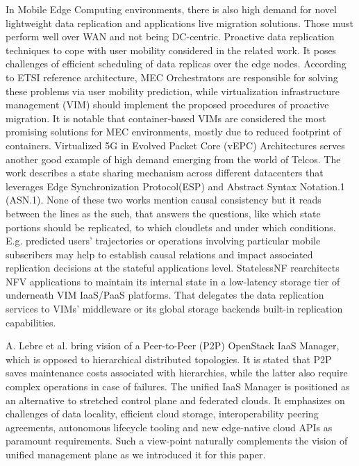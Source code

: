 \documentclass[conference]{IEEEtran}
\begin{document}
In Mobile Edge Computing environments, there is also high demand for novel
lightweight data replication and applications live migration solutions. Those
must perform well over WAN and not being DC-centric. Proactive data replication
techniques to cope with user mobility considered in the related work\cite{b14}.
It poses challenges of efficient scheduling of data replicas over the edge
nodes. According to ETSI reference architecture, MEC Orchestrators are
responsible for solving these problems via user mobility prediction, while
virtualization infrastructure management (VIM) should implement the proposed
procedures of proactive migration. It is notable that container‐based VIMs are
considered the most promising solutions for MEC environments, mostly due to
reduced footprint of containers. Virtualized 5G in Evolved Packet Core (vEPC)
Architectures\cite{b15} serves another good example of high demand emerging
from the world of Telcos. The work describes a state sharing mechanism across
different datacenters that leverages Edge Synchronization Protocol(ESP) and
Abstract Syntax Notation.1 (ASN.1). None of these two works mention
causal consistency but it reads between the lines as the such, that answers the
questions, like which state portions should be replicated, to which cloudlets
and under which conditions. E.g. predicted users' trajectories or operations
involving particular mobile subscribers may help to establish causal relations
and impact associated replication decisions at the stateful applications level.
StatelessNF\cite{b16} rearchitects NFV applications to maintain its internal
state in a low-latency storage tier of underneath VIM IaaS/PaaS platforms. That
delegates the data replication services to VIMs' middleware or its global
storage backends built-in replication capabilities.

A. Lebre et al.\cite{b9} bring vision of a Peer-to-Peer (P2P) OpenStack IaaS
Manager, which is opposed to hierarchical distributed topologies. It is stated
that P2P saves maintenance costs associated with hierarchies, while the latter
also require complex operations in case of failures. The unified IaaS Manager
is positioned as an alternative to stretched control plane and federated
clouds. It emphasizes on challenges of data locality, efficient cloud storage,
interoperability peering agreements, autonomous lifecycle tooling and new
edge-native cloud APIs as paramount requirements. Such a view-point naturally
complements the vision of unified management plane as we introduced it for this
paper.
\end{document}
